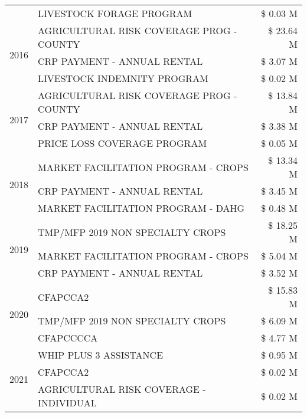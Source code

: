 \begin{tabular}{llr}
 & LIVESTOCK FORAGE PROGRAM & \$ 0.03 M \\
\cline{1-3}
\multirow[t]{3}{*}{2016} & AGRICULTURAL RISK COVERAGE PROG - COUNTY      & \$ 23.64 M \\
 & CRP PAYMENT - ANNUAL RENTAL                   & \$ 3.07 M \\
 & LIVESTOCK INDEMNITY PROGRAM                   & \$ 0.02 M \\
\cline{1-3}
\multirow[t]{3}{*}{2017} & AGRICULTURAL RISK COVERAGE PROG - COUNTY & \$ 13.84 M \\
 & CRP PAYMENT - ANNUAL RENTAL & \$ 3.38 M \\
 & PRICE LOSS COVERAGE PROGRAM & \$ 0.05 M \\
\cline{1-3}
\multirow[t]{3}{*}{2018} & MARKET FACILITATION PROGRAM - CROPS & \$ 13.34 M \\
 & CRP PAYMENT - ANNUAL RENTAL & \$ 3.45 M \\
 & MARKET FACILITATION PROGRAM - DAHG & \$ 0.48 M \\
\cline{1-3}
\multirow[t]{3}{*}{2019} & TMP/MFP 2019 NON SPECIALTY CROPS & \$ 18.25 M \\
 & MARKET FACILITATION PROGRAM - CROPS & \$ 5.04 M \\
 & CRP PAYMENT - ANNUAL RENTAL & \$ 3.52 M \\
\cline{1-3}
\multirow[t]{3}{*}{2020} & CFAPCCA2 & \$ 15.83 M \\
 & TMP/MFP 2019 NON SPECIALTY CROPS & \$ 6.09 M \\
 & CFAPCCCCA & \$ 4.77 M \\
\cline{1-3}
\multirow[t]{3}{*}{2021} & WHIP PLUS 3 ASSISTANCE & \$ 0.95 M \\
 & CFAPCCA2 & \$ 0.02 M \\
 & AGRICULTURAL RISK COVERAGE - INDIVIDUAL & \$ 0.02 M \\
\cline{1-3}
\bottomrule
\end{tabular}
